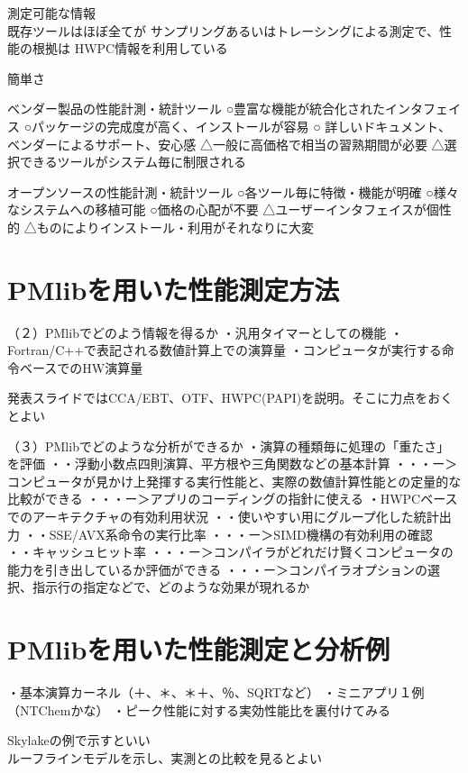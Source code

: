 \documentclass[submit,techrep,noauthor]{ipsj}
\begin{document}
測定可能な情報\\
{
既存ツールはほぼ全てが
サンプリングあるいはトレーシングによる測定で、性能の根拠は
HWPC情報を利用している
}

簡単さ\\
{
ベンダー製品の性能計測・統計ツール
○豊富な機能が統合化されたインタフェイス
○パッケージの完成度が高く、インストールが容易
○ 詳しいドキュメント、ベンダーによるサポート、安心感
△一般に高価格で相当の習熟期間が必要
△選択できるツールがシステム毎に制限される

オープンソースの性能計測・統計ツール
○各ツール毎に特徴・機能が明確
○様々なシステムへの移植可能
○価格の心配が不要
△ユーザーインタフェイスが個性的
△ものによりインストール・利用がそれなりに大変
}


\section{PMlibを用いた性能測定方法}


（２）PMlibでどのよう情報を得るか
・汎用タイマーとしての機能
・Fortran/C++で表記される数値計算上での演算量
・コンピュータが実行する命令ベースでのHW演算量

{ \color{BLUE}
発表スライドではCCA/EBT、OTF、HWPC(PAPI)を説明。そこに力点をおくとよい\\
}

（３）PMlibでどのような分析ができるか
・演算の種類毎に処理の「重たさ」を評価
・・浮動小数点四則演算、平方根や三角関数などの基本計算
・・・ー＞コンピュータが見かけ上発揮する実行性能と、実際の数値計算性能との定量的な比較ができる
・・・ー＞アプリのコーディングの指針に使える
・HWPCベースでのアーキテクチャの有効利用状況
・・使いやすい用にグループ化した統計出力
・・SSE/AVX系命令の実行比率
・・・ー＞SIMD機構の有効利用の確認
・・キャッシュヒット率
・・・ー＞コンパイラがどれだけ賢くコンピュータの能力を引き出しているか評価ができる
・・・ー＞コンパイラオプションの選択、指示行の指定などで、どのような効果が現れるか


\section{PMlibを用いた性能測定と分析例}
・基本演算カーネル（＋、＊、＊＋、％、SQRTなど）
・ミニアプリ１例（NTChemかな）
・ピーク性能に対する実効性能比を裏付けてみる

{ \color{BLUE}
Skylakeの例で示すといい\\
ルーフラインモデルを示し、実測との比較を見るとよい\\
}
\end{document}
